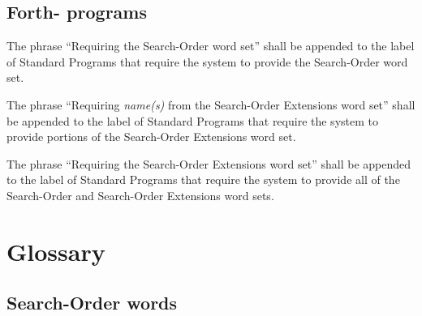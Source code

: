 \subsection{Forth-\snapshot{} programs} %

The phrase ``Requiring the Search-Order word set'' shall be appended
to the label of Standard Programs that require the system to provide
the Search-Order word set.

The phrase ``Requiring \emph{name(s)} from the Search-Order
Extensions word set'' shall be appended to the label of Standard
Programs that require the system to provide portions of the
Search-Order Extensions word set.

The phrase ``Requiring the Search-Order Extensions word set'' shall
be appended to the label of Standard Programs that require the system
to provide all of the Search-Order and Search-Order Extensions word
sets.


\section{Glossary} %

\subsection{Search-Order words} %

